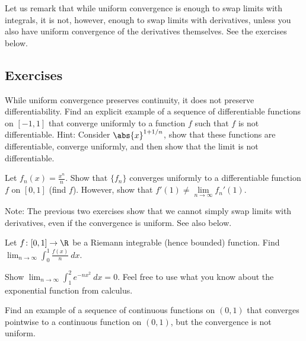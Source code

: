 \documentclass[12pt]{book}
\begin{document}
Let us remark that
while uniform convergence is enough to swap limits with integrals, it is not,
however, enough to swap limits with derivatives, unless you also have
uniform convergence of the derivatives themselves.
See the exercises below.

\subsection*{Exercises}

\begin{exercise}
While uniform convergence preserves continuity, it does not preserve
differentiability.
Find an explicit example of a sequence of
differentiable functions on $[-1,1]$ that converge uniformly to
a function $f$ such that $f$ is not differentiable.
Hint: Consider
$\abs{x}^{1+1/n}$, show that these functions are differentiable,
converge uniformly, and then show that the limit is not differentiable.
\end{exercise}

\begin{exercise}
Let $f_n(x) = \frac{x^n}{n}$.
Show that $\{ f_n \}$ converges uniformly to
a differentiable function $f$ on $[0,1]$ (find $f$).
However, show that
$f'(1) \not= \lim\limits_{n\to\infty} f_n'(1)$.
\end{exercise}

\begin{exnote}
Note: The previous two exercises show that
we cannot simply swap limits with derivatives, even if the convergence is
uniform.
See also  below.
\end{exnote}

\begin{exercise}
Let $f \colon [0,1] \to \R$ be a Riemann integrable (hence bounded)
function.
Find
$\displaystyle \lim_{n\to\infty} \int_0^1 \frac{f(x)}{n} ~dx$.
\end{exercise}

\begin{exercise}
Show
$\displaystyle \lim_{n\to\infty} \int_1^2 e^{-nx^2} ~dx = 0$.
Feel free to
use
what you know about the exponential function from calculus.
\end{exercise}

\begin{exercise}
Find an example of a sequence of continuous functions on $(0,1)$ that converges 
pointwise to a continuous function on $(0,1)$, but the convergence is not
uniform.
\end{exercise}
\end{document}
